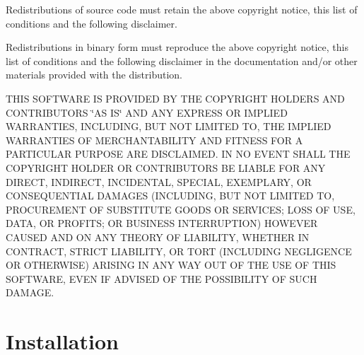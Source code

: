 \begin{DoxyEnumerate}
\item Redistributions of source code must retain the above copyright notice, this list of conditions and the following disclaimer.
\item Redistributions in binary form must reproduce the above copyright notice, this list of conditions and the following disclaimer in the documentation and/or other materials provided with the distribution.
\end{DoxyEnumerate}

T\-H\-I\-S S\-O\-F\-T\-W\-A\-R\-E I\-S P\-R\-O\-V\-I\-D\-E\-D B\-Y T\-H\-E C\-O\-P\-Y\-R\-I\-G\-H\-T H\-O\-L\-D\-E\-R\-S A\-N\-D C\-O\-N\-T\-R\-I\-B\-U\-T\-O\-R\-S \char`\"{}\-A\-S I\-S\char`\"{} A\-N\-D A\-N\-Y E\-X\-P\-R\-E\-S\-S O\-R I\-M\-P\-L\-I\-E\-D W\-A\-R\-R\-A\-N\-T\-I\-E\-S, I\-N\-C\-L\-U\-D\-I\-N\-G, B\-U\-T N\-O\-T L\-I\-M\-I\-T\-E\-D T\-O, T\-H\-E I\-M\-P\-L\-I\-E\-D W\-A\-R\-R\-A\-N\-T\-I\-E\-S O\-F M\-E\-R\-C\-H\-A\-N\-T\-A\-B\-I\-L\-I\-T\-Y A\-N\-D F\-I\-T\-N\-E\-S\-S F\-O\-R A P\-A\-R\-T\-I\-C\-U\-L\-A\-R P\-U\-R\-P\-O\-S\-E A\-R\-E D\-I\-S\-C\-L\-A\-I\-M\-E\-D. I\-N N\-O E\-V\-E\-N\-T S\-H\-A\-L\-L T\-H\-E C\-O\-P\-Y\-R\-I\-G\-H\-T H\-O\-L\-D\-E\-R O\-R C\-O\-N\-T\-R\-I\-B\-U\-T\-O\-R\-S B\-E L\-I\-A\-B\-L\-E F\-O\-R A\-N\-Y D\-I\-R\-E\-C\-T, I\-N\-D\-I\-R\-E\-C\-T, I\-N\-C\-I\-D\-E\-N\-T\-A\-L, S\-P\-E\-C\-I\-A\-L, E\-X\-E\-M\-P\-L\-A\-R\-Y, O\-R C\-O\-N\-S\-E\-Q\-U\-E\-N\-T\-I\-A\-L D\-A\-M\-A\-G\-E\-S (I\-N\-C\-L\-U\-D\-I\-N\-G, B\-U\-T N\-O\-T L\-I\-M\-I\-T\-E\-D T\-O, P\-R\-O\-C\-U\-R\-E\-M\-E\-N\-T O\-F S\-U\-B\-S\-T\-I\-T\-U\-T\-E G\-O\-O\-D\-S O\-R S\-E\-R\-V\-I\-C\-E\-S; L\-O\-S\-S O\-F U\-S\-E, D\-A\-T\-A, O\-R P\-R\-O\-F\-I\-T\-S; O\-R B\-U\-S\-I\-N\-E\-S\-S I\-N\-T\-E\-R\-R\-U\-P\-T\-I\-O\-N) H\-O\-W\-E\-V\-E\-R C\-A\-U\-S\-E\-D A\-N\-D O\-N A\-N\-Y T\-H\-E\-O\-R\-Y O\-F L\-I\-A\-B\-I\-L\-I\-T\-Y, W\-H\-E\-T\-H\-E\-R I\-N C\-O\-N\-T\-R\-A\-C\-T, S\-T\-R\-I\-C\-T L\-I\-A\-B\-I\-L\-I\-T\-Y, O\-R T\-O\-R\-T (I\-N\-C\-L\-U\-D\-I\-N\-G N\-E\-G\-L\-I\-G\-E\-N\-C\-E O\-R O\-T\-H\-E\-R\-W\-I\-S\-E) A\-R\-I\-S\-I\-N\-G I\-N A\-N\-Y W\-A\-Y O\-U\-T O\-F T\-H\-E U\-S\-E O\-F T\-H\-I\-S S\-O\-F\-T\-W\-A\-R\-E, E\-V\-E\-N I\-F A\-D\-V\-I\-S\-E\-D O\-F T\-H\-E P\-O\-S\-S\-I\-B\-I\-L\-I\-T\-Y O\-F S\-U\-C\-H D\-A\-M\-A\-G\-E.

\section*{Installation}

